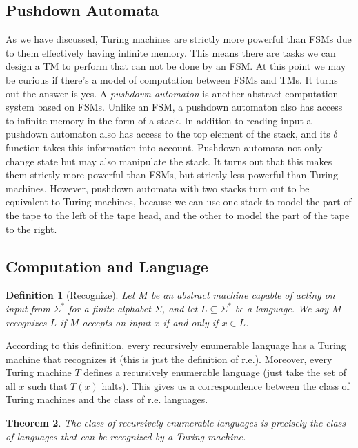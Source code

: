 \documentclass{article}
\theoremstyle{plain}
\newtheorem{theorem}{Theorem}[section]{\bfseries}{\itshape}
\newtheorem{definition}[theorem]{Definition}{\bfseries}{\upshape}
\begin{document}
\subsection{Pushdown Automata}
As we have discussed, Turing machines are strictly more powerful than FSMs due to them effectively having infinite memory. This means there are tasks we can design a TM to perform that can not be done by an FSM. At this point we may be curious if there's a model of computation between FSMs and TMs. It turns out the answer is yes. A \emph{pushdown automaton} is another abstract computation system based on FSMs. Unlike an FSM, a pushdown automaton also has access to infinite memory in the form of a stack. In addition to reading input a pushdown automaton also has access to the top element of the stack, and its $\delta$ function takes this information into account. Pushdown automata not only change state but may also manipulate the stack. It turns out that this makes them strictly more powerful than FSMs, but strictly less powerful than Turing machines. However, pushdown automata with two stacks turn out to be equivalent to Turing machines, because we can use one stack to model the part of the tape to the left of the tape head, and the other to model the part of the tape to the right.    


\subsection{Computation and Language}
\begin{definition}[Recognize]
Let $M$ be an abstract machine capable of acting on input from $\Sigma^*$ for a finite alphabet $\Sigma$, and let $L\subseteq\Sigma^*$ be a language. We say $M$ recognizes $L$ if $M$ accepts on input $x$ if and only if $x\in L$. 
\end{definition}

According to this definition, every recursively enumerable language has a Turing machine that recognizes it (this is just the definition of r.e.). Moreover, every Turing machine $T$ defines a recursively enumerable language (just take the set of all $x$ such that $T(x)$ halts). This gives us a correspondence between the class of Turing machines and the class of r.e. languages.

\begin{theorem}
The class of recursively enumerable languages is precisely the class of languages that can be recognized by a Turing machine.
\end{theorem}
\end{document}
